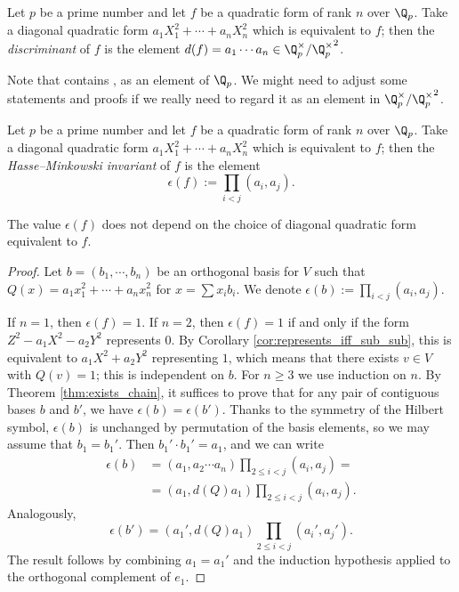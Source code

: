 \begin{definition}\label{def:discr}
\mathlibok
{}
Let $p$ be a prime number and let $f$ be a quadratic form of rank $n$ over $\Q_p$. Take a diagonal quadratic form $a_1X_1^2 + \cdots + a_nX_n^2$ which is equivalent to $f$; then the \emph{discriminant} of $f$ is the element $d(f) = a_1 \cdots a_n \in \Q_p^\times/{\Q_p^\times}^2$.

Note that \mathlib contains , as an element of $\Q_p$. We might need to adjust some statements and proofs if we really need to regard it as an element in $\Q_p^\times/{\Q_p^\times}^2$.
\end{definition}

\begin{definition}\label{def:HM_inv}
\leanok
Let $p$ be a prime number and let $f$ be a quadratic form of rank $n$ over $\Q_p$. Take a diagonal quadratic form $a_1X_1^2 + \cdots + a_nX_n^2$ which is equivalent to $f$; then the \emph{Hasse--Minkowski invariant} of $f$ is the element
\[ \epsilon(f) := \prod_{i < j}(a_i, a_j).\]
\end{definition}

\begin{lemma}\label{lem:HM_inv_well_defined}
\leanok
The value $\epsilon(f)$ does not depend on the choice of diagonal quadratic form equivalent to $f$.
\end{lemma}
\begin{proof}
Let $b = (b_1, \cdots, b_n)$ be an orthogonal basis for $V$ such that $Q(x) = a_1 x_1^2 + \cdots + a_n x_n^2$ for $x = \sum x_i b_i$. We denote  $\epsilon(b) := \prod_{i < j}(a_i, a_j)$.

If $n=1$, then $\epsilon(f) = 1$. If $n=2$, then $\epsilon(f) = 1$ if and only if the form $Z^2 - a_1 X^2 - a_2 Y^2$ represents $0$. By Corollary \ref{cor:represents_iff_sub_sub}, this is equivalent to $a_1 X^2 + a_2 Y^2$ representing $1$, which means that there exists $v \in V$ with $Q(v) = 1$; this is independent on $b$.
For $n \ge 3$ we use induction on $n$. By Theorem \ref{thm:exists_chain}, it suffices to prove that for any pair of contiguous bases $b$ and $b'$, we have $\epsilon(b) = \epsilon(b')$.
Thanks to the symmetry of the Hilbert symbol, $\epsilon(b)$ is unchanged by permutation of the basis elements, so we may assume that $b_1 = b_1'$.
Then $b_1' \cdot b_1' = a_1$, and we can write
\begin{align*}
	\epsilon(b) &= (a_1, a_2 \cdots a_n) \prod_{2 \le i < j} (a_i, a_j) = \\
	&= (a_1, d(Q) a_1) \prod_{2 \le i < j} (a_i, a_j).
\end{align*}
Analogously, \[\epsilon(b') = (a_1', d(Q) a_1) \prod_{2 \le i < j} (a_i', a_j'). \]
The result follows by combining $a_1 = a_1'$ and the induction hypothesis applied to the orthogonal complement of $e_1$.
\end{proof}

